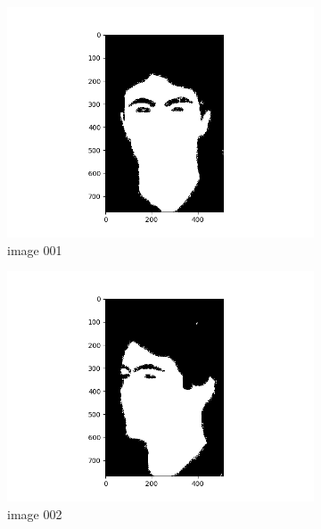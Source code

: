 \documentclass[11pt]{report}
\begin{document}
\begin{figure}[H]
    \centering
    \begin{subfigure}{0.3\textwidth}
        \centering
        \includegraphics[width=\textwidth]{Task 2 Plots/bin_mask_001.png}
        \caption{image 001}
        \label{fig:binmask1}
    \end{subfigure}
    \begin{subfigure}{0.3\textwidth}
        \centering
        \includegraphics[width=\textwidth]{Task 2 Plots/bin_mask_002.png}
        \caption{image 002}
        \label{fig:binmask2}
    \end{subfigure}
    \begin{subfigure}{0.3\textwidth}
        \centering

\end{subfigure}
\end{figure}
\end{document}
